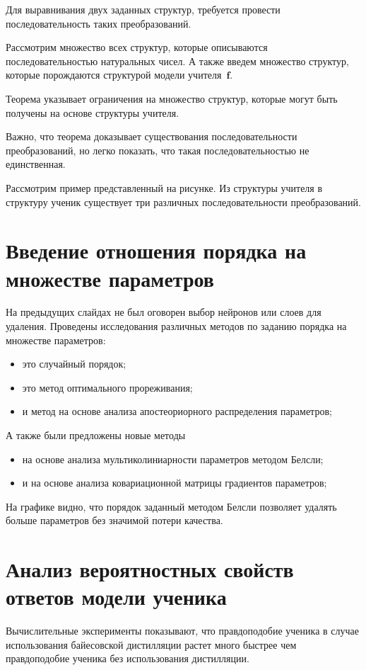 \documentclass[10pt, twoside]{article}
\begin{document}
Для выравнивания двух заданных структур, требуется провести последовательность таких преобразований.

Рассмотрим множество всех структур, которые описываются последовательностью натуральных чисел. А также введем множество структур, которые порождаются структурой модели учителя~$\mathbf{f}$.

Теорема указывает ограничения на множество структур, которые могут быть получены на основе структуры учителя.

Важно, что теорема доказывает существования последовательности преобразований, но легко показать, что такая последовательностью не единственная.

Рассмотрим пример представленный на рисунке. Из структуры учителя в структуру ученик существует три различных последовательности преобразований.

\section{Введение отношения порядка на множестве параметров}
На предыдущих слайдах не был оговорен выбор нейронов или слоев для удаления. Проведены исследования различных методов по заданию порядка на множестве параметров:
\begin{itemize}
    \item это случайный порядок;
    \item это метод оптимального прореживания;
    \item и метод на основе анализа апостеориорного распределения параметров;
\end{itemize}
А также были предложены новые методы
\begin{itemize}
    \item на основе анализа мультиколиниарности параметров методом Белсли;
    \item и на основе анализа ковариационной матрицы градиентов параметров;
\end{itemize}

На графике видно, что порядок заданный методом Белсли позволяет удалять больше параметров без значимой потери качества.

\section{Анализ вероятностных свойств ответов модели ученика}
Вычислительные эксперименты показывают, что правдоподобие ученика в случае использования байесовской дистилляции растет много быстрее чем правдоподобие ученика без использования дистилляции.
\end{document}
